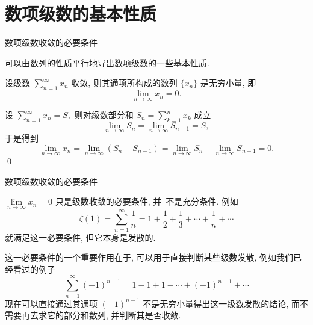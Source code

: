 
\section[基本性质]{数项级数的基本性质}


\begin{frame}{数项级数收敛的必要条件}

可以由数列的性质平行地导出数项级数的一些基本性质.

\pause

\begin{thm}[数项级数收敛的必要条件]
设级数 $\sum\limits_{n=1}^\infty x_n$ 收敛, 则其通项所构成的数列 $\{x_n\}$ 是无穷小量, 即
\[\lim\limits_{n\to\infty} x_n = 0.\]
\end{thm}

\pause

\startproof[bg=yellow, fg=red]
设 $\sum\limits_{n=1}^\infty x_n = S,$ 则对级数部分和 $S_n = \sum\limits_{k=1}^n x_k$ 成立
\[\lim\limits_{n\to\infty} S_n = \lim\limits_{n\to\infty} S_{n-1} = S,\]
于是得到
\[\lim\limits_{n\to\infty} x_n = \lim\limits_{n\to\infty} (S_n - S_{n-1}) = \lim\limits_{n\to\infty} S_n - \lim\limits_{n\to\infty} S_{n-1} = 0.\]
\qed

\end{frame}


\begin{frame}{数项级数收敛的必要条件}

\begin{attnblock}
$\lim\limits_{n\to\infty} x_n = 0$ 只是级数收敛的必要条件, 并~{\color{red}不是充分条件}. 例如
\[\zeta(1) = \sum\limits_{n=1}^{\infty} \dfrac{1}{n} = 1 + \dfrac{1}{2} + \dfrac{1}{3} + \cdots + \dfrac{1}{n} + \cdots\]
就满足这一必要条件, 但它本身是发散的.
\end{attnblock}

\pause
\vspace*{0.5em}

这一必要条件的一个重要作用在于, 可以用于直接判断某些级数发散, 例如我们已经看过的例子
\[\sum\limits_{n=1}^\infty (-1)^{n-1} = 1 - 1 + 1 - \cdots + (-1)^{n-1} + \cdots\]
现在可以直接通过其通项 $(-1)^{n-1}$ 不是无穷小量得出这一级数发散的结论, 而不需要再去求它的部分和数列, 并判断其是否收敛.

\end{frame}

